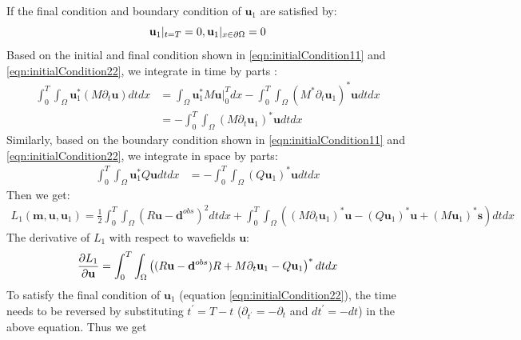 \documentclass[pdftex,a4paper,parskip,listof=totoc,bibliography=totoc,onehalfspacing,12pt]{scrreprt}
\begin{document}
If the final condition and boundary condition of $\mathbf{u}_{1}$ are satisfied by:
\begin{equation}
\label{eqn:initialCondition22}
 \mathbf{u}_{1}|_{t=T} = 0, \mathbf{u}_{1}|_{x\in \partial \Omega} = 0\\
\end{equation}
Based on the initial and final condition shown in \ref{eqn:initialCondition11} and \ref{eqn:initialCondition22}, we integrate in time by parts \citep{yang2016review}:
\begin{equation}
\begin{split}
\int_0^T \int_\Omega \mathbf{u}_{1}^{*} (M \partial_{t} \mathbf{u}) dt dx 
&=  \int_\Omega \mathbf{u}_{1}^{*} M\mathbf{u}|_0^T dx - \int_0^T \int_\Omega (M^{*} \partial_{t} \mathbf{u}_{1})^{*} \mathbf{u} dt dx\\
&= -\int_0^T \int_\Omega (M \partial_{t} \mathbf{u}_{1})^{*} \mathbf{u} dt dx
\end{split}
\end{equation}
Similarly, based on the boundary condition shown in \ref{eqn:initialCondition11} and \ref{eqn:initialCondition22}, we integrate in space by parts:
\begin{equation}
\begin{split}
\int_0^T \int_\Omega \mathbf{u}_{1}^{*} Q \mathbf{u} dt dx 
&=-\int_0^T \int_\Omega (Q \mathbf{u}_{1})^{*} \mathbf{u} dt dx
\end{split}
\end{equation}
Then we get:
\begin{equation}
\begin{split}
L_1(\mathbf{m}, \mathbf{u},\mathbf{u}_{1})
  = \frac{1}{2} \int_0^T \int_\Omega (R\mathbf{u} - \mathbf{d}^{obs})^2 dt dx + \int_0^T \int_\Omega ((M \partial_{t} \mathbf{u}_{1})^{*} \mathbf{u} - (Q \mathbf{u}_{1})^{*} \mathbf{u} + (M \mathbf{u}_{1})^{*} \mathbf{s})  dt dx
 \end{split}
\end{equation}
The derivative of $L_1$ with respect to wavefields $\mathbf{u}$:
\begin{equation}
 \pdv{L_1}{\mathbf{u}} = \int_0^T \int_\Omega \left((R\mathbf{u} - \mathbf{d}^{obs})R + M \partial_{t} \mathbf{u}_{1} - Q \mathbf{u}_{1}\right)^{*} dt dx
\end{equation}
To satisfy the final condition of $\mathbf{u}_{1}$ (equation \ref{eqn:initialCondition22}), the time needs to be reversed by substituting $t^{'}=T-t$ ($\partial_{t^{'}} = -\partial_{t}$ and $dt^{'}=-dt$) in the above equation. Thus we get
\end{document}
